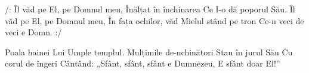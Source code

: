 \beginchorus
/: Îl văd pe El, pe Domnul meu,
Înălțat în închinarea
Ce I-o dă poporul Său.
Îl văd pe El, pe Domnul meu,
În fața ochilor, văd Mielul stând pe tron
Ce-n veci de veci e Domn. :/
\endchorus

\beginverse
Poala hainei Lui
Umple templul.
Mulțimile de-nchinători
Stau în jurul Său
Cu corul de îngeri
Cântând: „Sfânt, sfânt, sfânt e Dumnezeu,
E sfânt doar El!”
\endverse
\endsong